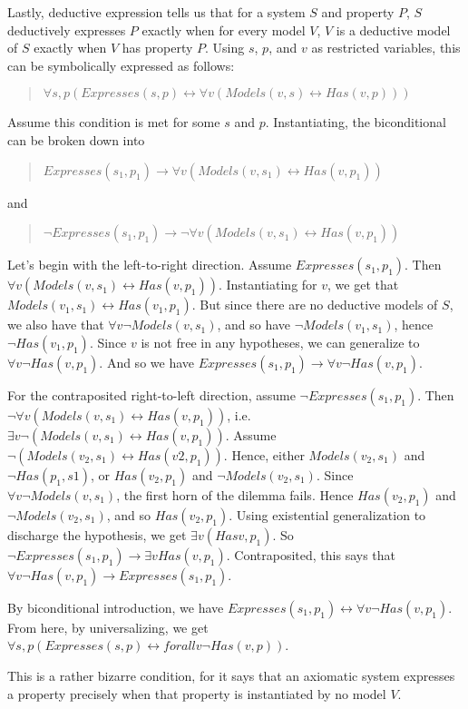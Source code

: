 \documentclass[]{article}
\begin{document}
Lastly, deductive expression tells us that for a system $S$ and property $P$, $S$ deductively expresses $P$ exactly when for every model $V$, $V$ is a deductive model of $S$ exactly when $V$ has property $P$. Using $s$, $p$, and $v$ as restricted variables, this can be symbolically expressed as follows:
\begin{quote}
$\forall s, p(Expresses(s, p) \leftrightarrow \forall v(Models(v, s) \leftrightarrow Has(v, p)))$
\end{quote}
Assume this condition is met for some $s$ and $p$. Instantiating, the biconditional can be broken down into 
\begin{quote}
$Expresses(s_{1}, p_{1}) \rightarrow \forall v(Models(v, s_{1}) \leftrightarrow Has(v, p_{1}))$
\end{quote}
and 
\begin{quote}
$\neg Expresses(s_{1}, p_{1})\rightarrow \neg\forall v(Models(v, s_{1}) \leftrightarrow Has(v, p_{1})) $
\end{quote}
Let's begin with the left-to-right direction. Assume $Expresses(s_{1},p_{1})$. Then $\forall v(Models(v, s_{1}) \leftrightarrow Has(v, p_{1}))$. Instantiating for $v$, we get that $Models(v_{1}, s_{1}) \leftrightarrow Has(v_{1}, p_{1})$. But since there are no deductive models of $S$, we also have that $\forall v\neg Models(v, s_{1})$, and so have $\neg Models(v_{1}, s_{1})$, hence $\neg Has(v_{1}, p_{1})$. Since $v$ is not free in any hypotheses, we can generalize to $\forall v \neg Has(v, p_{1})$. And so we have $Expresses(s_{1}, p_{1}) \rightarrow \forall v \neg Has(v, p_{1})$.

For the contraposited right-to-left direction, assume $\neg Expresses(s_{1}, p_{1})$. Then $\neg\forall v(Models(v, s_{1}) \leftrightarrow Has(v, p_{1}))$, i.e. $\exists v \neg(Models(v, s_{1}) \leftrightarrow Has(v, p_{1}))$. Assume $\neg(Models(v_{2}, s_{1}) \leftrightarrow Has(v{2}, p_{1}))$. Hence, either $Models(v_{2}, s_{1})$ and $\neg Has(p_{1}, s{1})$, or $Has(v_{2}, p_{1})$ and $\neg Models(v_{2}, s_{1})$. Since $\forall v \neg Models(v, s_{1})$, the first horn of the dilemma fails. Hence $Has(v_{2}, p_{1})$ and $\neg Models(v_{2}, s_{1})$, and so $Has(v_{2}, p_{1})$. Using existential generalization to discharge the hypothesis, we get $\exists v(Has v, p_{1})$. So $\neg Expresses(s_{1}, p_{1}) \rightarrow \exists v Has (v, p_{1})$. Contraposited, this says that $\forall v \neg Has (v, p_{1}) \rightarrow Expresses(s_{1}, p_{1})$.

By biconditional introduction, we have $Expresses(s_{1}, p_{1}) \leftrightarrow \forall v \neg Has(v, p_{1})$. From here, by universalizing, we get $\forall s, p(Expresses (s, p) \leftrightarrow forall v \neg Has(v, p))$.

This is a rather bizarre condition, for it says that an axiomatic system expresses a property precisely when that property is instantiated by no model $V$.
\end{document}
